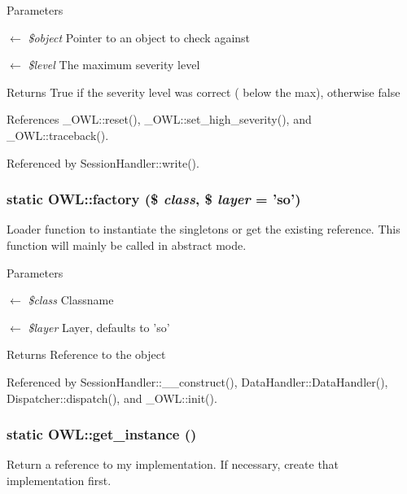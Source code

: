 \begin{DoxyParams}{Parameters}
\item[\mbox{$\leftarrow$} {\em \$object}]Pointer to an object to check against \item[\mbox{$\leftarrow$} {\em \$level}]The maximum severity level \end{DoxyParams}
\begin{DoxyReturn}{Returns}
True if the severity level was correct ( below the max), otherwise false 
\end{DoxyReturn}


References \_\-OWL::reset(), \_\-OWL::set\_\-high\_\-severity(), and \_\-OWL::traceback().



Referenced by SessionHandler::write().

\subsubsection[{factory}]{\setlength{\rightskip}{0pt plus 5cm}static OWL::factory (\$ {\em class}, \/  \$ {\em layer} = {\ttfamily 'so'})}\label{classOWL_aa6f4f99b9b0d6c77e7d49075d8a29d69}
Loader function to instantiate the singletons or get the existing reference. This function will mainly be called in abstract mode. 
\begin{DoxyParams}{Parameters}
\item[\mbox{$\leftarrow$} {\em \$class}]Classname \item[\mbox{$\leftarrow$} {\em \$layer}]Layer, defaults to 'so' \end{DoxyParams}
\begin{DoxyReturn}{Returns}
Reference to the object 
\end{DoxyReturn}


Referenced by SessionHandler::\_\-\_\-construct(), DataHandler::DataHandler(), Dispatcher::dispatch(), and \_\-OWL::init().

\subsubsection[{get\_\-instance}]{\setlength{\rightskip}{0pt plus 5cm}static OWL::get\_\-instance ()}\label{classOWL_ae75b698b8f0aa7f9106ce84744ff10ed}
Return a reference to my implementation. If necessary, create that implementation first.

